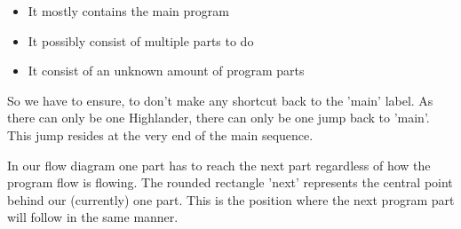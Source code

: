 \begin{itemize}
  \item It mostly contains the main program
  \item It possibly consist of multiple parts to do
  \item It consist of an unknown amount of program parts
\end{itemize}

So we have to ensure, to don't make any shortcut back to the 'main' label. As there can only be one Highlander, there can only be one jump back to 'main'. This jump resides at the very end of the main sequence.

In our flow diagram one part has to reach the next part regardless of how the program flow is flowing. The rounded rectangle 'next' represents the central point behind our (currently) one part. This is the position where the next program part will follow in the same manner.

